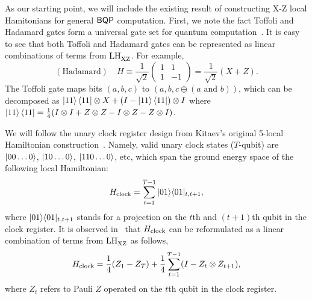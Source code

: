 As our starting point, we will include the existing result of constructing X-Z local Hamitonians for general $\operatorname{\mathsf{BQP}}$ computation. First, we note the fact Toffoli and Hadamard gates form a universal gate set for quantum computation~\cite{Shi03, quant-ph/0301040}. 
It is easy to see that both Toffoli and Hadamard gates can be represented as linear combinations of terms from $\mathrm{LH}_{\mathrm{XZ}}^{}$. For example, 
\begin{equation}
    \mathrm{(Hadamard)} \quad H \equiv \frac{1}{\sqrt{2}} \begin{pmatrix}1&1\\1&-1\end{pmatrix} = \frac{1}{\sqrt{2}}\left (X+Z\right).
\end{equation}
The Toffoli gate maps bits $(a,b,c)$ to $(a,b, c \oplus (a \text{ and } b))$, which can be decomposed as $\ket{11}\bra{11}\otimes X+(I-\ket{11}\bra{11})\otimes I$ where $\ket{11}\bra{11}=\frac{1}{4}(I\otimes I+Z\otimes Z-I\otimes Z-Z\otimes I)$.

We will follow the unary clock register design from Kitaev's original 5-local Hamiltonian construction~\cite{kitaev2002classical}. Namely, valid unary clock states ($T$-qubit) are $\ket{00\ldots0}$, $\ket{10\dots0}$, $\ket{110\ldots0}$, etc, which span the ground energy space of the following local Hamiltonian: 
\begin{equation}
    H_{\mathrm{clock}}= \sum_{t=1}^{T-1}|01\rangle\langle 01|_{t,t+1},
\end{equation}
where $|01\rangle\langle 01|_{t,t+1}$ stands for a projection on the $t$th and $(t+1)$th qubit in the clock register. 
It is observed in~\cite{PhysRevA.78.012352} that $H_{\mathrm{clock}}$ can be reformulated as a linear combination of terms from $\mathrm{LH}_{\mathrm{XZ}}^{}$ as follows, 
\begin{equation}
   H_{\mathrm{clock}}= \frac{1}{4}(Z_1 - Z_T) + \frac{1}{4}\sum_{t=1}^{T-1}(I-Z_t\otimes Z_{t+1}),
\end{equation}
where $Z_t$ refers to Pauli $Z$ operated on the $t$th qubit in the clock register. 

